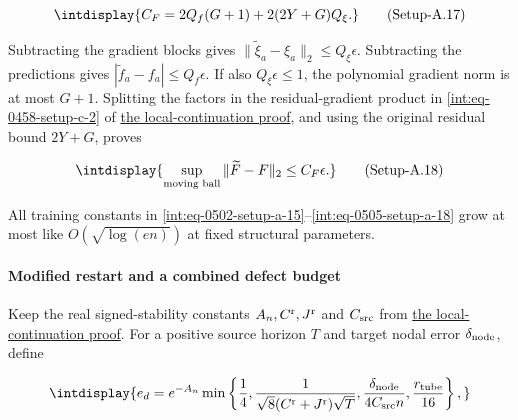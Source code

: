 \label{int:eq-setup-a-17}
\begingroup\renewcommand{\theHequation}{intdisplay.981}
\begin{equation}
\intdisplay{
C_F=2Q_f(G+1)+2(2Y+G)Q_\xi.
}
\tag{Setup-A.17}
\label{int:eq-0504-setup-a-17}
\end{equation}
\endgroup


Subtracting the gradient blocks gives \(\|\widetilde\xi_a-\xi_a\|_2\le Q_\xi\epsilon\). Subtracting the predictions gives \(|\widetilde f_a-f_a|\le Q_f\epsilon\). If also \(Q_\xi\epsilon\le1\), the polynomial gradient norm is at most \(G+1\). Splitting the factors in the residual-gradient product in \hyperref[int:eq-setup-c-2]{\eqref{int:eq-0458-setup-c-2}} of \hyperref[int:setup-core]{the local-continuation proof}, and using the original residual bound \(2Y+G\), proves


\label{int:eq-setup-a-18}
\begingroup\renewcommand{\theHequation}{intdisplay.982}
\begin{equation}
\intdisplay{
\sup_{\text{moving ball}}\|\widetilde F-F\|_2
\le C_F\epsilon.
}
\tag{Setup-A.18}
\label{int:eq-0505-setup-a-18}
\end{equation}
\endgroup


All training constants in \hyperref[int:eq-setup-a-15]{\eqref{int:eq-0502-setup-a-15}}--\allowbreak \hyperref[int:eq-setup-a-18]{\eqref{int:eq-0505-setup-a-18}} grow at most like \(O(\sqrt{\log(en)})\) at fixed structural parameters.


\paragraph{Modified restart and a combined defect budget}
\label{int:setup-activation-4}
\mbox{}\par\smallskip


Keep the real signed-stability constants \(A_n,\allowbreak C^{\rm r},\allowbreak J^{\rm r}\) and \(C_{\rm src}\) from \hyperref[int:setup-core]{the local-continuation proof}. For a positive source horizon \(T\) and target nodal error \(\delta_{\rm node}\), define


\begingroup\renewcommand{\theHequation}{intdisplay.983}
\begin{equation*}
\intdisplay{
e_d=e^{-A_n}\min\left\{\frac14,
 \frac1{\sqrt8(C^{\rm r}+J^{\rm r})\sqrt T},
 \frac{\delta_{\rm node}}{4C_{\rm src}n},\frac{r_{\rm tube}}{16}\right\},
}
\end{equation*}
\endgroup


